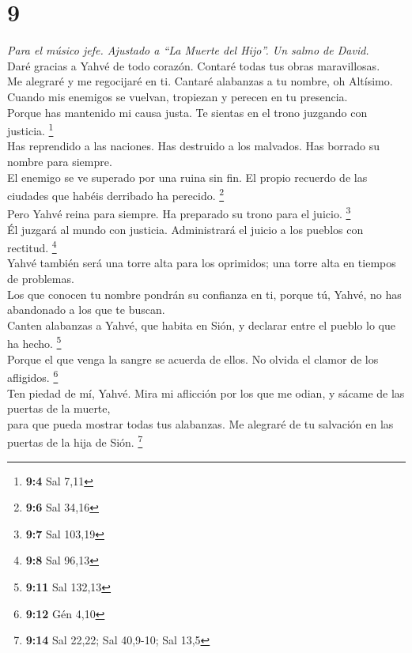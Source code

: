 \hypertarget{section-8}{%
\section{9}\label{section-8}}

\emph{Para el músico jefe. Ajustado a ``La Muerte del Hijo''. Un salmo
de David.}\\
 Daré gracias a Yahvé de todo corazón. Contaré todas tus
obras maravillosas.\\
 Me alegraré y me regocijaré en ti. Cantaré alabanzas a tu
nombre, oh Altísimo.\\
 Cuando mis enemigos se vuelvan, tropiezan y perecen en tu
presencia.\\
 Porque has mantenido mi causa justa. Te sientas en el
trono juzgando con justicia. \footnote{\textbf{9:4} Sal 7,11}\\
 Has reprendido a las naciones. Has destruido a los
malvados. Has borrado su nombre para siempre.\\
 El enemigo se ve superado por una ruina sin fin. El
propio recuerdo de las ciudades que habéis derribado ha perecido.
\footnote{\textbf{9:6} Sal 34,16}\\
 Pero Yahvé reina para siempre. Ha preparado su trono para
el juicio. \footnote{\textbf{9:7} Sal 103,19}\\
 Él juzgará al mundo con justicia. Administrará el juicio
a los pueblos con rectitud. \footnote{\textbf{9:8} Sal 96,13}\\
 Yahvé también será una torre alta para los oprimidos; una
torre alta en tiempos de problemas.\\
 Los que conocen tu nombre pondrán su confianza en ti,
porque tú, Yahvé, no has abandonado a los que te buscan.\\
 Canten alabanzas a Yahvé, que habita en Sión, y declarar
entre el pueblo lo que ha hecho. \footnote{\textbf{9:11} Sal 132,13}\\
 Porque el que venga la sangre se acuerda de ellos. No
olvida el clamor de los afligidos. \footnote{\textbf{9:12} Gén 4,10}\\
 Ten piedad de mí, Yahvé. Mira mi aflicción por los que
me odian, y sácame de las puertas de la muerte,\\
 para que pueda mostrar todas tus alabanzas. Me alegraré
de tu salvación en las puertas de la hija de Sión. \footnote{\textbf{9:14}
  Sal 22,22; Sal 40,9-10; Sal 13,5}\\
